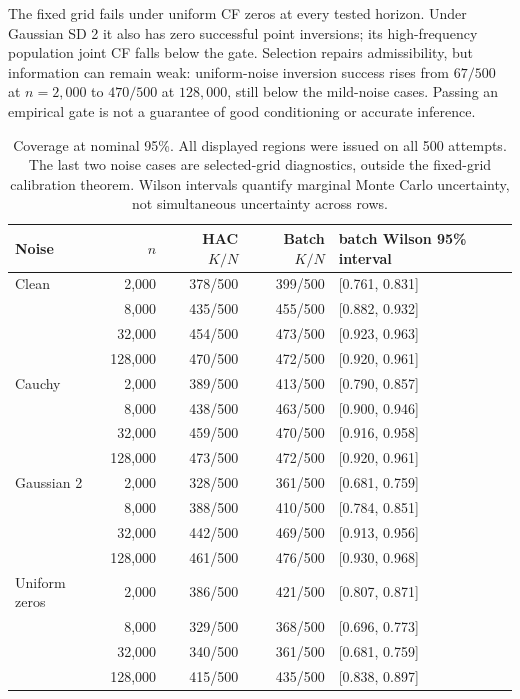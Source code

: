 \documentclass[11pt,a4paper]{article}
\theoremstyle{remark}\newtheorem{remark}[theorem]{Remark}
\begin{document}
The fixed grid fails under uniform CF zeros at every tested horizon. Under Gaussian SD 2 it also has zero successful point inversions; its high-frequency population joint CF falls below the gate. Selection repairs admissibility, but information can remain weak: uniform-noise inversion success rises from $67/500$ at $n=2{,}000$ to $470/500$ at $128{,}000$, still below the mild-noise cases. Passing an empirical gate is not a guarantee of good conditioning or accurate inference.

\begin{table}[htbp]\centering\small
\caption{Coverage at nominal 95\%. All displayed regions were issued on all 500 attempts. The last two noise cases are selected-grid diagnostics, outside the fixed-grid calibration theorem. Wilson intervals quantify marginal Monte Carlo uncertainty, not simultaneous uncertainty across rows.}\label{tab:coverage}
\begin{tabular}{lrrrl}\toprule
Noise & $n$ & HAC $K/N$ & Batch $K/N$ & batch Wilson 95\% interval\\ \midrule
Clean & 2,000 & 378/500 & 399/500 & [0.761, 0.831] \\
 & 8,000 & 435/500 & 455/500 & [0.882, 0.932] \\
 & 32,000 & 454/500 & 473/500 & [0.923, 0.963] \\
 & 128,000 & 470/500 & 472/500 & [0.920, 0.961] \\
\addlinespace[0.6ex]
Cauchy & 2,000 & 389/500 & 413/500 & [0.790, 0.857] \\
 & 8,000 & 438/500 & 463/500 & [0.900, 0.946] \\
 & 32,000 & 459/500 & 470/500 & [0.916, 0.958] \\
 & 128,000 & 473/500 & 472/500 & [0.920, 0.961] \\
\addlinespace[0.6ex]
Gaussian 2 & 2,000 & 328/500 & 361/500 & [0.681, 0.759] \\
 & 8,000 & 388/500 & 410/500 & [0.784, 0.851] \\
 & 32,000 & 442/500 & 469/500 & [0.913, 0.956] \\
 & 128,000 & 461/500 & 476/500 & [0.930, 0.968] \\
\addlinespace[0.6ex]
Uniform zeros & 2,000 & 386/500 & 421/500 & [0.807, 0.871] \\
 & 8,000 & 329/500 & 368/500 & [0.696, 0.773] \\
 & 32,000 & 340/500 & 361/500 & [0.681, 0.759] \\
 & 128,000 & 415/500 & 435/500 & [0.838, 0.897] \\
\bottomrule\end{tabular}
\end{table}
\end{document}

